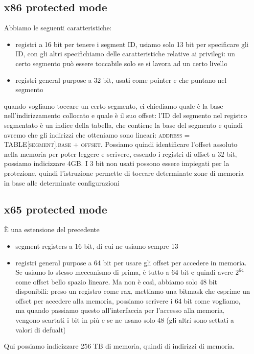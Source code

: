 \documentclass[12pt, oneside]{extbook}
\begin{document}
\subsection{x86 protected mode}
Abbiamo le seguenti caratteristiche:
\begin{itemize}
\item registri a 16 bit per tenere i segment ID, usiamo solo 13 bit per specificare gli ID, con gli altri specifichiamo delle caratteristiche relative ai privilegi: un certo segmento può essere toccabile solo se si lavora ad un certo livello
\item registri general purpose a 32 bit, usati come pointer e che puntano nel segmento 
\end{itemize}
quando vogliamo toccare un certo segmento, ci chiediamo quale è la base nell'indirizzamento collocato e quale è il suo offset: l'ID del segmento nel registro segmentato è un indice della tabella, che contiene la base del segmento e quindi avremo che gli indirizzi che otteniamo sono lineari: \textsc{address} = \textsc{TABLE[segment].base + offset}. Possiamo quindi identificare l'offset assoluto nella memoria per poter leggere e scrivere, essendo i registri di offset a 32 bit, possiamo indicizzare 4GB. I 3 bit non usati possono essere impiegati per la protezione, quindi l'istruzione permette di toccare determinate zone di memoria in base alle determinate configurazioni
\subsection{x65 protected mode}
È una estensione del precedente
\begin{itemize}
\item segment registers a 16 bit, di cui ne usiamo sempre 13
\item registri general purpose a 64 bit per usare gli offset per accedere in memoria. Se usiamo lo stesso meccanismo di prima, è tutto a 64 bit e quindi avere $2^{64}$ come offset bello spazio lineare. Ma non è così, abbiamo solo 48 bit disponibili: preso un registro come \textsf{rax}, mettiamo una bitmask che esprime un offset per accedere alla memoria, possiamo scrivere i 64 bit come vogliamo, ma quando passiamo questo all'interfaccia per l'accesso alla memoria, vengono scartati i bit in più e se ne usano solo 48 (gli altri sono settati a valori di defualt)
\end{itemize}
Qui possiamo indicizzare 256 TB di memoria, quindi di indirizzi di memoria.
\end{document}
